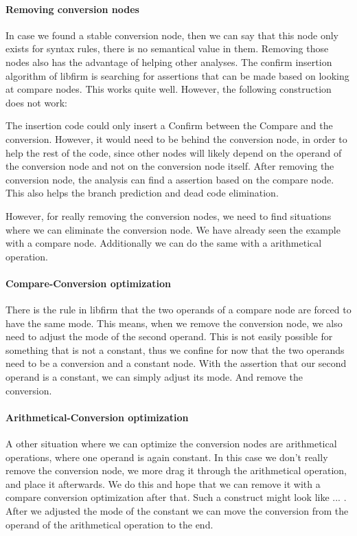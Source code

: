 \paragraph{Removing conversion nodes}
In case we found a stable conversion node, then we can say that this node only exists for syntax rules, there is no semantical value in them. Removing those nodes also has the advantage of helping other analyses. The confirm insertion algorithm of libfirm is searching for assertions that can be made based on looking at compare nodes. This works quite well. However, the following construction does not work:

The insertion code could only insert a Confirm between the Compare and the conversion. However, it would need to be behind the conversion node, in order to help the rest of the code, since other nodes will likely depend on the operand of the conversion node and not on the conversion node itself. 
After removing the conversion node, the analysis can find a assertion based on the compare node. This also helps the branch prediction and dead code elimination.

However, for really removing the conversion nodes, we need to find situations where we can eliminate the conversion node. We have already seen the example with a compare node. Additionally we can do the same with a arithmetical operation.

\paragraph{Compare-Conversion optimization}
There is the rule in libfirm that the two operands of a compare node are forced to have the same mode. This means, when we remove the conversion node, we also need to adjust the mode of the second operand. This is not easily possible for something that is not a constant, thus we confine for now that the two operands need to be a conversion and a constant node.
With the assertion that our second operand is a constant, we can simply adjust its mode. And remove the conversion. 

\paragraph{Arithmetical-Conversion optimization}
A other situation where we can optimize the conversion nodes are arithmetical operations, where one operand is again constant. In this case we don't really remove the conversion node, we more drag it through the arithmetical operation, and place it afterwards. We do this and hope that we can remove it with a compare conversion optimization after that.
Such a construct might look like ... . After we adjusted the mode of the constant we can move the conversion from the operand of the arithmetical operation to the end.
